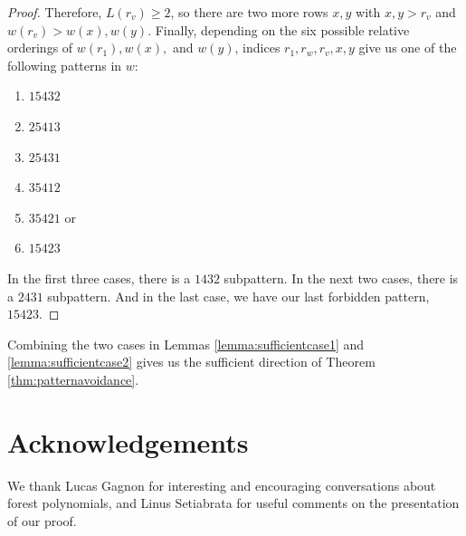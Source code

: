 \documentclass{article}
\theoremstyle{definition} %
\begin{document}
\begin{proof}
    Therefore, $L(r_v) \geq 2$, so there are two more rows $x, y$ with $x, y > r_v$ and $w(r_v) > w(x), w(y)$. Finally, depending on the six possible relative orderings of $w(r_1), w(x),$ and $w(y)$, indices $r_1, r_w, r_v, x, y$ give us one of the following patterns in $w$: 
    \begin{enumerate}
        \item $15432$
        \item $25413$
        \item $25431$
        \item $35412$
        \item $35421$ or 
        \item $15423$
    \end{enumerate}

    In the first three cases, there is a $1432$ subpattern. In the next two cases, there is a $2431$ subpattern. And in the last case, we have our last forbidden pattern, $15423$. 
\end{proof}

Combining the two cases in Lemmas \ref{lemma:sufficientcase1} and \ref{lemma:sufficientcase2} gives us the sufficient direction of Theorem \ref{thm:patternavoidance}. 

\section{Acknowledgements}

We thank Lucas Gagnon for interesting and encouraging conversations about forest polynomials, and Linus Setiabrata for useful comments on the presentation of our proof. 



\end{document}
